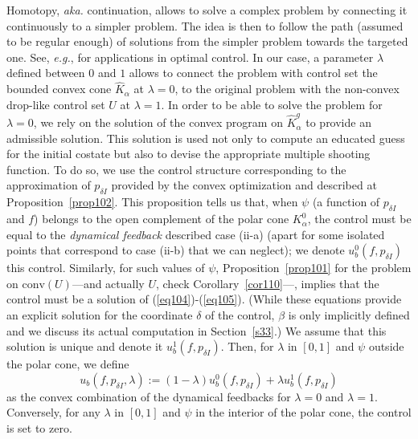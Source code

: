 \documentclass[AMA,STIX1COL]{WileyNJD-v2}
\newcommand{\conv}{\text{conv}}
\begin{document}
%
Homotopy, \emph{aka.} continuation, allows to solve a complex problem by connecting it continuously to
a simpler problem. The idea is then to follow the path (assumed to be regular enough) of solutions from
the simpler problem towards the targeted one.
See, \emph{e.g.}, \cite{gergaud-2006a,Trelat2017} for applications in optimal control.
In our case, a parameter $\lambda$ defined between $0$ and $1$ allows to connect the problem with control
set the bounded convex cone $\hat{K}_\alpha$ at $\lambda=0$, to the original problem with the
non-convex drop-like control set $U$ at $\lambda=1$.
In order to be able to solve the problem for $\lambda=0$, we rely on the solution of the convex
program on $\hat{K}^g_\alpha$ to provide an admissible solution.
This solution is used not only to compute an
educated guess for the initial costate but also to devise the appropriate multiple shooting function. 
To do so, we use the control structure
corresponding to the approximation of $p_{\delta I}$ provided by the
convex optimization and described at Proposition~\ref{prop102}. This proposition tells us that,
when $\psi$ (a function of $p_{\delta I}$ and $f$) belongs to the open complement of the polar cone
$K^0_\alpha$, the control must be equal to the \emph{dynamical feedback} described case (ii-a)
(apart for some isolated points that correspond to case (ii-b) that we can neglect); we denote
$u^0_b(f,p_{\delta I})$ this control. Similarly, for such values of $\psi$, Proposition~\ref{prop101} for
the problem on $\conv(U)$---and actually $U$, check Corollary~\ref{cor110}---, implies that the control must
be a solution of (\ref{eq104})-(\ref{eq105}). (While these equations provide an explicit solution for 
the coordinate $\delta$ of the control, $\beta$ is only implicitly defined and we discuss its actual 
computation in Section~\ref{s33}.)
We assume that this solution is unique and denote it $u^1_b(f,p_{\delta I})$.
Then, for $\lambda$ in $[0,1]$ and $\psi$ outside the polar cone, we define
$$ u_b(f,p_{\delta I},\lambda) := (1-\lambda)u^0_b(f,p_{\delta I}) + \lambda u^1_b(f,p_{\delta I}) $$
as the convex combination of the dynamical feedbacks for $\lambda=0$ and $\lambda=1$.
Conversely, for any $\lambda$ in $[0,1]$ and $\psi$ in the interior of the polar cone, the control is set
to zero.
\end{document}
